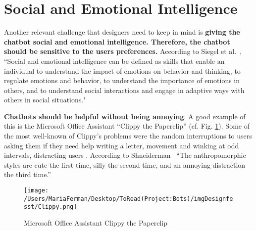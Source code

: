 \documentclass[a4paper,10pt]{article}
\begin{document}

\section{Social and Emotional Intelligence}

Another relevant challenge that designers need to keep in mind is \textbf{giving the chatbot social and emotional intelligence. Therefore, the chatbot should be sensitive to the users preferences.} According to Siegel et al.~\cite{siegel2012pocket}, ``Social and emotional intelligence can be defined as skills that enable an individual to understand the impact of emotions on behavior and thinking, to regulate emotions and behavior, to understand the importance of emotions in others, and to understand social interactions and engage in adaptive ways with others in social situations."

\textbf{Chatbots should be helpful without being annoying}. A good example of this is the Microsoft Office Assistant ``Clippy the Paperclip” (cf. Fig. \ref{FigureClippy}). Some of the most well-known of Clippy's problems were the random interruptions to users asking them if they need help writing a letter, movement and winking at odd intervals, distracting users \cite{Clippy2015}. According to Shneiderman~\cite{shneiderman1995looking} ``The anthropomorphic styles are cute the first time, silly the second time, and an annoying distraction the third time.”

\begin{figure}
\centering
\texttt{[image: /Users/MariaFerman/Desktop/ToRead(Project:Bots)/imgDesignfesst/Clippy.png]}
\caption{Microsoft Office Assistant Clippy the Paperclip}
\label{FigureClippy}
\end{figure}
\end{document}
